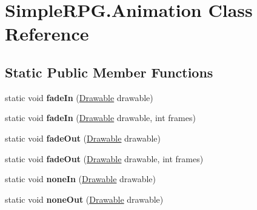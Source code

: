 \hypertarget{class_simple_r_p_g_1_1_animation}{\section{Simple\+R\+P\+G.\+Animation Class Reference}
\label{class_simple_r_p_g_1_1_animation}
}
\subsection*{Static Public Member Functions}
\begin{DoxyCompactItemize}
\item 
\hypertarget{class_simple_r_p_g_1_1_animation_a6c30d271e7914db827c587792d36c1ce}{static void {\bfseries fade\+In} (\hyperlink{class_simple_r_p_g_1_1_drawable}{Drawable} drawable)}\label{class_simple_r_p_g_1_1_animation_a6c30d271e7914db827c587792d36c1ce}

\item 
\hypertarget{class_simple_r_p_g_1_1_animation_a8a5a03c9d244c3248c828f5c8c961f9f}{static void {\bfseries fade\+In} (\hyperlink{class_simple_r_p_g_1_1_drawable}{Drawable} drawable, int frames)}\label{class_simple_r_p_g_1_1_animation_a8a5a03c9d244c3248c828f5c8c961f9f}

\item 
\hypertarget{class_simple_r_p_g_1_1_animation_a289c9da41575652f1b2573722af62527}{static void {\bfseries fade\+Out} (\hyperlink{class_simple_r_p_g_1_1_drawable}{Drawable} drawable)}\label{class_simple_r_p_g_1_1_animation_a289c9da41575652f1b2573722af62527}

\item 
\hypertarget{class_simple_r_p_g_1_1_animation_a464fa54ff15747341f46bffa81e5a977}{static void {\bfseries fade\+Out} (\hyperlink{class_simple_r_p_g_1_1_drawable}{Drawable} drawable, int frames)}\label{class_simple_r_p_g_1_1_animation_a464fa54ff15747341f46bffa81e5a977}

\item 
\hypertarget{class_simple_r_p_g_1_1_animation_a70728603a4b9154a487cbb8eb8bbef04}{static void {\bfseries none\+In} (\hyperlink{class_simple_r_p_g_1_1_drawable}{Drawable} drawable)}\label{class_simple_r_p_g_1_1_animation_a70728603a4b9154a487cbb8eb8bbef04}

\item 
\hypertarget{class_simple_r_p_g_1_1_animation_aece2c00c52312d164c9ecf73f6f342d7}{static void {\bfseries none\+Out} (\hyperlink{class_simple_r_p_g_1_1_drawable}{Drawable} drawable)}\label{class_simple_r_p_g_1_1_animation_aece2c00c52312d164c9ecf73f6f342d7}


\end{DoxyCompactItemize}
